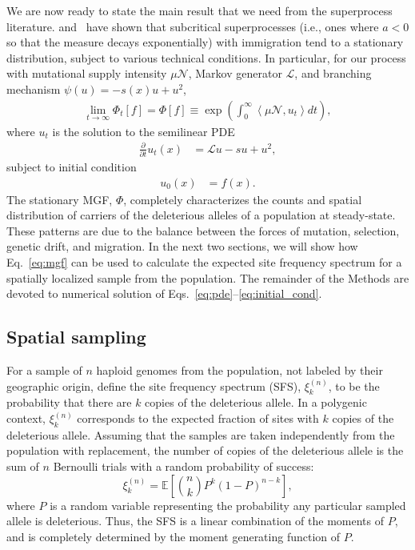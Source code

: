 \documentclass{article}
\begin{document}
We are now ready to state the main result that we need from the superprocess literature.
\cite{Stannat} and~\cite{Friesen} have shown that subcritical superprocesses (i.e., ones where $a < 0$ so that the measure decays exponentially) with immigration tend to a stationary distribution, subject to various technical conditions.
In particular, for our process with mutational supply intensity $\mu \mathcal{N}$, Markov generator $\mathcal{L}$, and branching mechanism $\psi(u) = -s(x)u + u^2$,
\begin{align}
    \lim_{t\to \infty}\Phi_t[f] = \Phi[f] \equiv \exp \left( \int_0^\infty \left< \mu \mathcal{N}, u_t \right> dt\right),
    \label{eq:mgf}
\end{align}
where $u_t$ is the solution to the semilinear PDE
\begin{align}
    \frac{\partial}{\partial{t}}u_t(x) & = \mathcal{L}u - su + u^2,
    \label{eq:pde}
\end{align}
subject to initial condition
\begin{align}
    u_0(x) & = f(x).
    \label{eq:initial_cond}
\end{align}
The stationary MGF, $\Phi$, completely characterizes the counts and spatial distribution of carriers of the deleterious alleles of a population at steady-state.
These patterns are due to the balance between the forces of mutation, selection, genetic drift, and migration.
In the next two sections, we will show how Eq.~\ref{eq:mgf} can be used to calculate the expected site frequency spectrum for a spatially localized sample from the population.
The remainder of the Methods are devoted to numerical solution of Eqs.~\ref{eq:pde}--\ref{eq:initial_cond}.

\subsection*{Spatial sampling}

For a sample of $n$ haploid genomes from the population, not labeled by their geographic origin, define the site frequency spectrum (SFS), $\xi^{(n)}_k$, to be the probability that there are $k$ copies of the deleterious allele.
In a polygenic context, $\xi^{(n)}_k$ corresponds to the expected fraction of sites with $k$ copies of the deleterious allele.
Assuming that the samples are taken independently from the population with replacement, the number of copies of the deleterious allele is the sum of $n$ Bernoulli trials with a random probability of success:
\begin{equation}
    \xi^{(n)}_k = \mathbb{E}\left[ {n \choose k} {P}^k {\left(1-P\right)}^{n-k} \right],
    \label{eq:sfs}
\end{equation}
where $P$ is a random variable representing the probability any particular sampled allele is deleterious.
Thus, the SFS is a linear combination of the moments of $P$, and is completely determined by the moment generating function of $P$.
\end{document}
